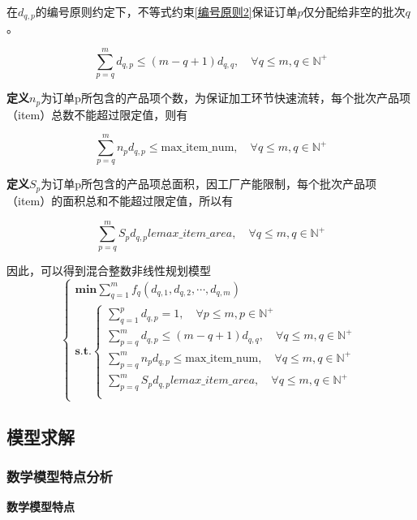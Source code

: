 \documentclass[bwprint]{gmcmthesis}
\begin{document}
在$d_{q,p}$的编号原则约定下，不等式约束\ref{编号原则2}保证订单$p$仅分配给非空的批次$q$。

\begin{equation}   
\sum_{p=q}^{m} d_{q,p} \le (m-q+1)d_{q,q},\quad \forall q\le m,q\in \mathbb{N}^+\label{编号原则2}
\end{equation}

\textbf{定义}$n_p$为订单p所包含的产品项个数，为保证加工环节快速流转，每个批次产品项（item）总数不能超过限定值，则有

\begin{equation}   
    \sum_{p=q}^{m} n_pd_{q,p} \le \text{max\_item\_num},\quad \forall q \le m, q\in \mathbb{N}^+
\end{equation}

\textbf{定义}$S_p$为订单p所包含的产品项总面积，因工厂产能限制，每个批次产品项（item）的面积总和不能超过限定值，所以有

\begin{equation}   
    \sum_{p=q}^{m} S_pd_{q,p} le max\_item\_area,\quad \forall q\le m,q\in \mathbb{N}^+
\end{equation}

因此，可以得到混合整数非线性规划模型
\begin{equation}
    \begin{cases}
        \mathbf{min} \sum_{q=1}^{m} f_q(d_{q,1},d_{q,2},\cdots,d_{q,m}) \\
        \mathbf{s.t.}
        \begin{cases}
            \sum_{q=1}^{p} d_{q,p}=1,\quad \forall p\le m,p \in \mathbb{N}^+ \\
            \sum_{p=q}^{m} d_{q,p} \le (m-q+1)d_{q,q},\quad \forall q\le m,q\in \mathbb{N}^+  \\
            \sum_{p=q}^{m} n_pd_{q,p} \le \text{max\_item\_num},\quad \forall q \le m, q\in \mathbb{N}^+\\
            \sum_{p=q}^{m} S_pd_{q,p} le max\_item\_area,\quad \forall q\le m,q\in \mathbb{N}^+ \\
        \end{cases}  \label{问题二模型}
    \end{cases}
\end{equation}


\subsection{模型求解}
\subsubsection{数学模型特点分析}
	\textbf{数学模型特点} 
	
\end{document}

